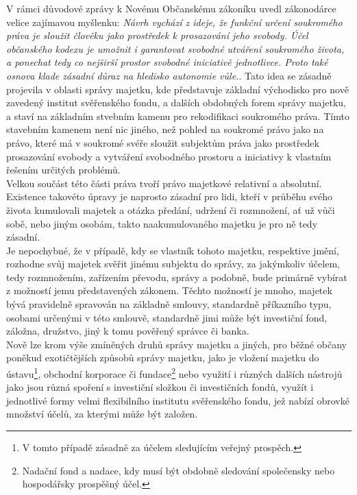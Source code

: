 \documentclass{article}
\begin{document}
V rámci důvodové zprávy k Novému Občanskému zákoníku uvedl zákonodárce velice zajímavou myšlenku: \textit{Návrh vychází z ideje, že funkční určení soukromého práva je sloužit člověku jako prostředek k prosazování jeho svobody. Účel občanského kodexu je umožnit i garantovat svobodné utváření soukromého života, a ponechat tedy co nejširší prostor svobodné iniciativě jednotlivce. Proto také osnova klade zásadní důraz na hledisko autonomie vůle.}. Tato idea se zásadně projevila v oblasti správy majetku, kde představuje základní východisko pro nově zavedený institut svěřenského fondu, a dalších obdobných forem správy majetku, a staví na základním stvebním kamenu pro rekodifikaci soukromého práva. Tímto stavebním kamenem není nic jiného, než pohled na soukromé právo jako na právo, které má v soukromé svéře sloužit subjektům práva jako prostředek prosazování svobody a vytváření svobodného prostoru a iniciativy k vlastním řešením určitých problémů.\\

Velkou součást této části práva tvoří právo majetkové relativní a absolutní. Existence takovéto úpravy je naprosto zásadní pro lidi, kteří v průběhu svého života kumulovali majetek a otázka předání, udržení či rozmnožení, ať už vůči sobě, nebo jiným osobám, takto naakumulovaného majetku je pro ně tedy zásadní.\\

Je nepochybné, že v případě, kdy se vlastník tohoto majetku, respektive jmění, rozhodne svůj majetek svěřit jinému subjektu do správy, za jakýmkoliv účelem, tedy rozmnožením, zařízením převodu, správy a podobně, bude primárně vybírat z možností jemu představených zákonem. Těchto možností je mnoho, majetek bývá pravidelně spravován na základně smlouvy, standardně příkazního typu, osobami určenými v této smlouvě, standardně jimi může být investiční fond, záložna, družstvo, jiný k tomu pověřený správce či banka.\\

Nově lze krom výše zmíněných druhů správy majetku a jiných, pro běžné občany poněkud exotičtějších způsobů správy majetku, jako je vložení majetku do ústavu\footnote{V tomto případě zásadně za účelem sledujícím veřejný prospěch.}, obchodní korporace či fundace\footnote{Nadační fond a nadace, kdy musí být obdobně sledování společensky nebo hospodářsky prospěšný účel.} nebo využití i různých dalších nástrojů jako jsou různá spoření s investiční složkou či investičních fondů, využít i jednotlivé formy velmi flexibilního institutu svěřenského fondu, jež nabízí obrovké množství účelů, za kterými může být založen.\\
\end{document}
